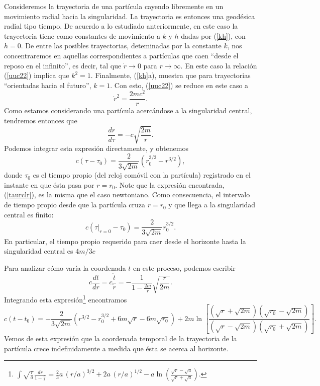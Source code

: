 Consideremos la trayectoria de una partícula cayendo libremente en un movimiento radial hacia la singularidad. La trayectoria es entonces una geodésica radial tipo tiempo. De acuerdo a lo estudiado anteriormente, en este caso la trayectoria tiene como constantes de movimiento a $k$ y $h$ dadas por (\ref{kh}), con $h=0$. De entre las posibles trayectorias, deteminadas por la constante $k$, nos concentraremos en aquellas correspondientes a partículas que caen  ``desde el reposo en el infinito'', es decir, tal que $\dot{r}\to 0$ para $r\to\infty$. En este caso la relación (\ref{uuc22}) implica que $k^2=1$. Finalmente, (\ref{kh}a), muestra que para trayectorias ``orientadas hacia el futuro'', $k=1$. Con esto, (\ref{uuc22}) se reduce en este caso a
\begin{equation}
\dot{r}^2 =\frac{2mc^2}{r} .\label{pi1}
\end{equation}
Como estamos considerando una partícula acercándose a la singularidad central, tendremos entonces que
\begin{equation}
\frac{dr}{d\tau}=-c\sqrt{\frac{2m}{r}} .
\end{equation}
Podemos integrar esta expresión directamente, y obtenemos
\begin{equation}
 c(\tau-\tau_0)=\frac{2}{3\sqrt{2m}}\left(r_0^{3/2}-r^{3/2}\right), \label{taurclr}
\end{equation}
donde $\tau_0$ es el tiempo propio (del reloj comóvil con la partícula) registrado en el instante en que ésta pasa por $r=r_0$. Note que la expresión encontrada, (\ref{taurclr}), es la misma que el caso newtoniano. Como consecuencia, el intervalo de tiempo propio desde que la partícula cruza $r=r_0$ y que llega a la singularidad central es finito:
\begin{equation}
 c(\tau|_{r=0}-\tau_0)=\frac{2}{3\sqrt{2m}}r_0^{3/2}.
\end{equation}
En particular, el tiempo propio requerido para caer desde el horizonte hasta la singularidad central es $4m/3c$

Para analizar cómo varía la coordenada $t$ en este proceso, podemos escribir
\begin{equation}
 c\frac{dt}{dr}=c\frac{\dot{t}}{\dot{r}}=-\frac{1}{1-\frac{2m}{r}}\sqrt{\frac{r}{2m}}.
\end{equation}
Integrando esta expresión\footnote{$\int\sqrt{\frac{r}{a}}\frac{dr}{1-\frac{a}{r}}=\frac{2}{3}a\, (r/a)^{3/2}+2a\,(r/a)^{1/2}-a\ln\left(\frac{\sqrt{r}-\sqrt{a}}{\sqrt{r}+\sqrt{a}}\right) $.} encontramos
\begin{equation}
c(t-t_0)=-\frac{2}{3\sqrt{2m}}\left(r^{3/2} -r_0^{3/2}+6m\sqrt{r}-6m\sqrt{r_0}\right)+2m\ln\left[\frac{(\sqrt{r}+\sqrt{2m})(\sqrt{r_0}-\sqrt{2m})}{(\sqrt{r}-\sqrt{2m})(\sqrt{r_0}+\sqrt{2m})}\right].
\end{equation}
Vemos de esta expresión que la coordenada temporal de la trayectoria de la partícula crece indefinidamente a medida que ésta se acerca al horizonte.


